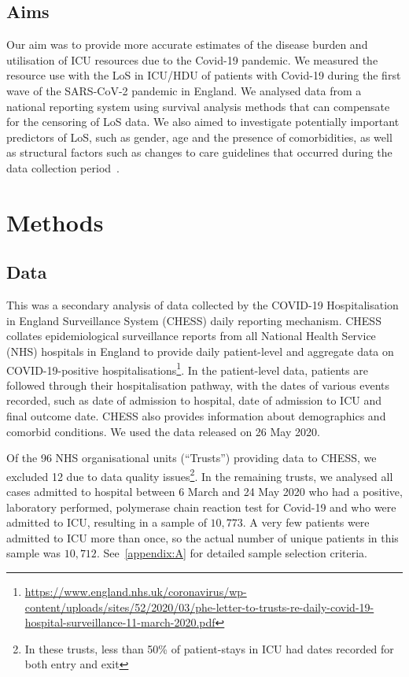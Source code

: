 \documentclass[review]{elsarticle}
\begin{document}
\subsection{Aims}

Our aim was to provide more accurate estimates of the disease burden and utilisation of ICU resources due to the Covid-19 pandemic. We measured the resource use with the LoS in ICU/HDU of patients with Covid-19 during the first wave of the SARS-CoV-2 pandemic in England. We analysed data from a national reporting system using survival analysis methods that can compensate for the censoring of LoS data. We also aimed to investigate potentially important predictors of LoS, such as gender, age and the presence of comorbidities, as well as structural factors such as changes to care guidelines that occurred during the data collection period~\cite{nice2020,bamford2020ics}. 

\section{Methods}

\subsection{Data}

This was a secondary analysis of data collected by the COVID-19 Hospitalisation in England Surveillance System (CHESS) daily reporting mechanism. CHESS collates epidemiological surveillance reports from all National Health Service (NHS) hospitals in England to provide daily patient-level and aggregate data on COVID-19-positive hospitalisations\footnote{\url{https://www.england.nhs.uk/coronavirus/wp-content/uploads/sites/52/2020/03/phe-letter-to-trusts-re-daily-covid-19-hospital-surveillance-11-march-2020.pdf}}. In the patient-level data, patients are followed through their hospitalisation pathway, with the dates of various events recorded, such as date of admission to hospital, date of admission to ICU and final outcome date. CHESS also provides information about demographics and comorbid conditions. We used the data released on 26 May 2020.

Of the 96 NHS organisational units (“Trusts”) providing data to CHESS, we excluded 12 due to data quality issues\footnote{In these trusts, less than 50\% of patient-stays in ICU had dates recorded for both entry and exit}. In the remaining trusts, we analysed all cases admitted to hospital between 6 March and 24 May 2020 who had a positive, laboratory performed, polymerase chain reaction test for Covid-19 and who were admitted to ICU, resulting in a sample of $10,773$. A very few patients were admitted to ICU more than once, so the actual number of unique patients in this sample was $10,712$. See~\ref{appendix:A}  for detailed sample selection criteria.
\end{document}

